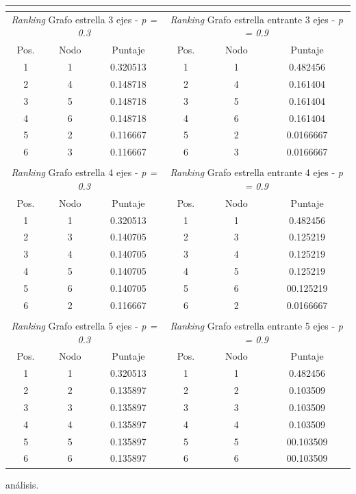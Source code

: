 \begin{center}
\begin{tabular}{|c|c|c||c|c|c|}
                    \multicolumn{3}{c}{} \\ \hline
                    \multicolumn{3}{|c||}{\emph{Ranking} Grafo estrella 3 ejes - \emph{p = 0.3}} & \multicolumn{3}{c|}{\emph{Ranking} Grafo estrella entrante 3 ejes - \emph{p = 0.9}} \\ \hline
                    Pos. & Nodo & Puntaje    & Pos. & Nodo & Puntaje  \\ \hline 


1 & 1 & 0.320513 & 1 & 1 & 0.482456 \\ 
2 & 4 & 0.148718 & 2 & 4 &  0.161404 \\
3 & 5 & 0.148718  & 3 & 5 &  0.161404 \\
4 & 6 & 0.148718  & 4 & 6 &  0.161404 \\
5 & 2 & 0.116667 & 5 & 2 &  0.0166667 \\
6 & 3 & 0.116667 & 6 & 3 & 0.0166667 \\ \hline

                    \multicolumn{3}{c}{} \\ \hline
                    \multicolumn{3}{|c||}{\emph{Ranking} Grafo estrella 4 ejes - \emph{p = 0.3}} & \multicolumn{3}{c|}{\emph{Ranking} Grafo estrella entrante 4 ejes - \emph{p = 0.9}} \\ \hline
                    Pos. & Nodo & Puntaje    & Pos. & Nodo & Puntaje  \\ \hline 

1 & 1 & 0.320513 & 1 & 1 & 0.482456 \\ 
2 & 3 & 0.140705 & 2 & 3 &  0.125219 \\
3 & 4 & 0.140705  & 3 & 4 &  0.125219 \\
4 & 5 & 0.140705  & 4 & 5 &  0.125219 \\
5 & 6 & 0.140705 & 5 & 6 &  00.125219 \\
6 & 2 & 0.116667 & 6 & 2 & 0.0166667 \\ \hline

                    \multicolumn{3}{c}{} \\ \hline
                    \multicolumn{3}{|c||}{\emph{Ranking} Grafo estrella 5 ejes - \emph{p = 0.3}} & \multicolumn{3}{c|}{\emph{Ranking} Grafo estrella entrante 5 ejes - \emph{p = 0.9}} \\ \hline
                    Pos. & Nodo & Puntaje    & Pos. & Nodo & Puntaje  \\ \hline 

1 & 1 & 0.320513 & 1 & 1 & 0.482456 \\ 
2 & 2 & 0.135897 & 2 & 2 &  0.103509 \\
3 & 3 & 0.135897  & 3 & 3 &  0.103509 \\
4 & 4 & 0.135897  & 4 & 4 &  0.103509 \\
5 & 5 & 0.135897 & 5 & 5 &  00.103509 \\
6 & 6 & 0.135897 & 6 & 6 & 00.103509 \\ \hline

                \end{tabular}
            \end{center} 
            
análisis.            
                                               